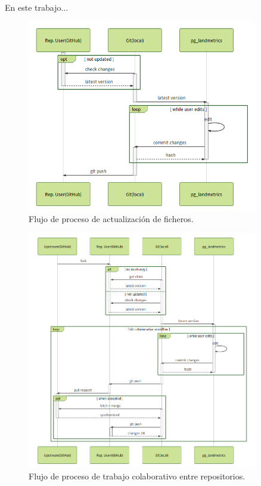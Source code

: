En este trabajo...

\begin{figure}
\begin{center}
\includegraphics[width=0.9\textwidth]{Metodologia/Figs/diary.png}
\caption{Flujo de proceso de actualización de ficheros. \label{fig:diary}}
\end{center}
\end{figure}



\begin{figure}
\begin{center}
\includegraphics[width=0.9\textwidth]{Metodologia/Figs/pullrequest.png}
\caption{Flujo de proceso de trabajo colaborativo entre repositorios. \label{fig:pullrequest}}
\end{center}
\end{figure}


